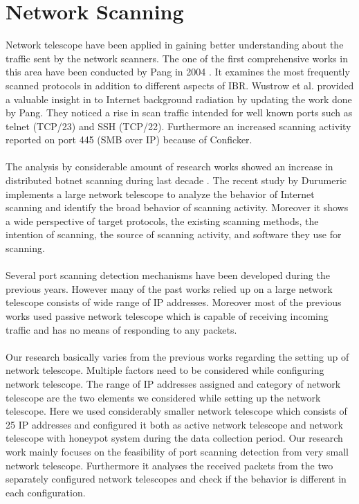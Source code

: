     \section{Network Scanning }
    Network telescope have been applied in gaining better understanding about the traffic sent by the network scanners.
    The one of the first comprehensive works in this area have been conducted by Pang in 2004 \cite{pang2004characteristics}.
    It examines the most frequently scanned protocols in addition to different aspects of IBR.
    Wustrow et al. \cite{wustrow2010internet} provided a valuable insight in to Internet background radiation by updating the work done by Pang.
    They noticed a rise in scan traffic intended for well known ports such as telnet (TCP/23) and SSH (TCP/22).
    Furthermore an increased scanning activity reported on port 445 (SMB over IP) because of Conficker.\\\\
    The analysis by considerable amount of research works showed an increase in distributed botnet scanning during last decade \cite{leckie2002probabilistic}\cite{schechter2004fast}\cite{jung2004fast}.
    The recent study by Durumeric \cite{durumeric2014internet} implements a large network telescope to analyze the behavior of Internet scanning and identify the broad behavior of scanning activity.
    Moreover it shows a wide perspective of target protocols, the existing scanning methods, the intention of scanning, the source of scanning activity, and software they use for scanning.\\\\
    Several port scanning detection mechanisms have been developed during the previous years.
    However many of the past works relied up on a large network telescope consists of wide range of IP addresses.
    Moreover most of the previous works used passive network telescope which is  capable of receiving incoming traffic and has no means of responding to any packets.\\\\
    Our research basically varies from the previous works regarding the setting up of network telescope.
    Multiple factors need to be considered while configuring network telescope.
    The range of IP addresses assigned and category of network telescope are the two elements we considered while setting up the network telescope.
    Here we used considerably smaller network telescope which consists of 25 IP addresses and configured it both as active network telescope and network telescope with honeypot system during the data collection period.
    Our research work mainly focuses on the feasibility of port scanning detection from very small network telescope.
    Furthermore it analyses the received packets from the two separately configured network telescopes and check if the behavior is different in each configuration.
    
    
    
    
 